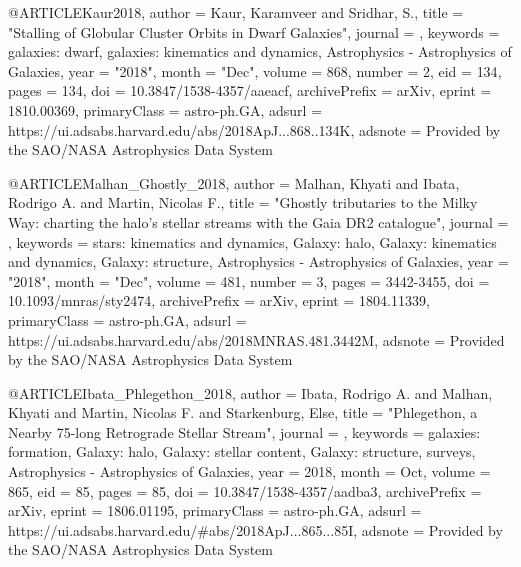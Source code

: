 \documentclass[apj]{emulateapj}
\begin{document}
{{@ARTICLE{Kaur2018,
       author = {{Kaur}, Karamveer and {Sridhar}, S.},
        title = "{Stalling of Globular Cluster Orbits in Dwarf Galaxies}",
      journal = {\apj},
     keywords = {galaxies: dwarf, galaxies: kinematics and dynamics, Astrophysics - Astrophysics of Galaxies},
         year = "2018",
        month = "Dec",
       volume = {868},
       number = {2},
          eid = {134},
        pages = {134},
          doi = {10.3847/1538-4357/aaeacf},
archivePrefix = {arXiv},
       eprint = {1810.00369},
 primaryClass = {astro-ph.GA},
       adsurl = {https://ui.adsabs.harvard.edu/abs/2018ApJ...868..134K},
      adsnote = {Provided by the SAO/NASA Astrophysics Data System}
}




       

@ARTICLE{Malhan_Ghostly_2018,
       author = {{Malhan}, Khyati and {Ibata}, Rodrigo A. and {Martin}, Nicolas F.},
        title = "{Ghostly tributaries to the Milky Way: charting the halo's stellar streams with the Gaia DR2 catalogue}",
      journal = {\mnras},
     keywords = {stars: kinematics and dynamics, Galaxy: halo, Galaxy: kinematics and dynamics, Galaxy: structure, Astrophysics - Astrophysics of Galaxies},
         year = "2018",
        month = "Dec",
       volume = {481},
       number = {3},
        pages = {3442-3455},
          doi = {10.1093/mnras/sty2474},
archivePrefix = {arXiv},
       eprint = {1804.11339},
 primaryClass = {astro-ph.GA},
       adsurl = {https://ui.adsabs.harvard.edu/abs/2018MNRAS.481.3442M},
      adsnote = {Provided by the SAO/NASA Astrophysics Data System}
}









@ARTICLE{Ibata_Phlegethon_2018,
       author = {{Ibata}, Rodrigo A. and {Malhan}, Khyati and {Martin}, Nicolas F. and
        {Starkenburg}, Else},
        title = "{Phlegethon, a Nearby 75{\textdegree}-long Retrograde Stellar Stream}",
      journal = {\apj},
     keywords = {galaxies: formation, Galaxy: halo, Galaxy: stellar content, Galaxy: structure, surveys, Astrophysics - Astrophysics of Galaxies},
         year = 2018,
        month = Oct,
       volume = {865},
          eid = {85},
        pages = {85},
          doi = {10.3847/1538-4357/aadba3},
archivePrefix = {arXiv},
       eprint = {1806.01195},
 primaryClass = {astro-ph.GA},
       adsurl = {https://ui.adsabs.harvard.edu/\#abs/2018ApJ...865...85I},
      adsnote = {Provided by the SAO/NASA Astrophysics Data System}
}


}}
\end{document}
